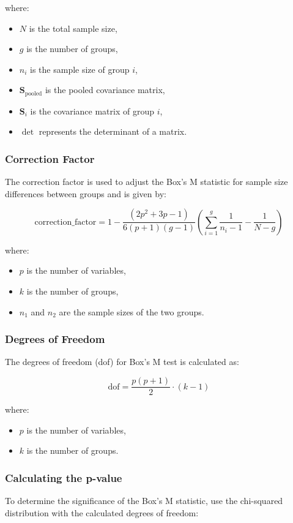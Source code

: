 \documentclass[11pt]{article}
\begin{document}
where:
\begin{itemize}
    \item \( N \) is the total sample size,
    \item \( g \) is the number of groups,
    \item \( n_i \) is the sample size of group \( i \),
    \item \( \mathbf{S}_{\text{pooled}} \) is the pooled covariance matrix,
    \item \( \mathbf{S}_i \) is the covariance matrix of group \( i \),
    \item \( \det \) represents the determinant of a matrix.
\end{itemize}

\subsubsection{Correction Factor}
The correction factor is used to adjust the Box's M statistic for sample size differences between groups and is given by:

\[
\text{correction\_factor} = 1 - \frac{(2p^2 + 3p - 1)}{6(p + 1)(g - 1)} \left( \sum_{i=1}^{g} \frac{1}{n_i - 1} - \frac{1}{N - g} \right)
\]

where:
\begin{itemize}
    \item \( p \) is the number of variables,
    \item \( k \) is the number of groups,
    \item \( n_1 \) and \( n_2 \) are the sample sizes of the two groups.
\end{itemize}

\subsubsection{Degrees of Freedom}
The degrees of freedom (dof) for Box's M test is calculated as:

\[
\text{dof} = \frac{p(p + 1)}{2} \cdot (k - 1)
\]

where:
\begin{itemize}
    \item \( p \) is the number of variables,
    \item \( k \) is the number of groups.
\end{itemize}

\subsubsection{Calculating the p-value}
To determine the significance of the Box's M statistic, use the chi-squared distribution with the calculated degrees of freedom:
\end{document}
